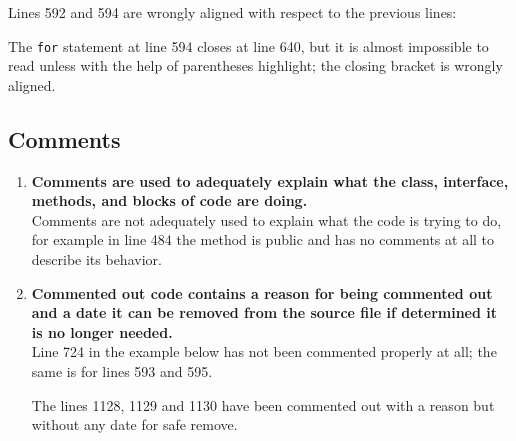 \documentclass[a4paper,11pt]{report} %
\begin{document}
\begin{enumerate}[resume]
				\pagebreak
				Lines 592 and 594 are wrongly aligned with respect to the previous lines:
				
				The \texttt{for} statement at line 594 closes at line 640, but it is almost impossible to read unless with the help of parentheses highlight; the closing bracket is wrongly aligned.
		\end{enumerate}
		
		\subsection*{Comments}\begin{enumerate}[resume]
			\item \textbf{Comments are used to adequately explain what the class, interface, methods, and blocks of code are doing.}\smallskip \\
				Comments are not adequately used to explain what the code is trying to do, for example in line 484 the method is public and has no comments at all to describe its behavior.
				
			\item \textbf{Commented out code contains a reason for being commented out and a date it can be removed from the source file if determined it is no longer needed.}\smallskip \\
				Line 724 in the example below has not been commented properly at all; the same is for lines 593 and 595.
				
				The lines 1128, 1129 and 1130 have been commented out with a reason but without any date for safe remove.
				

		\end{enumerate}
		
\end{document}
